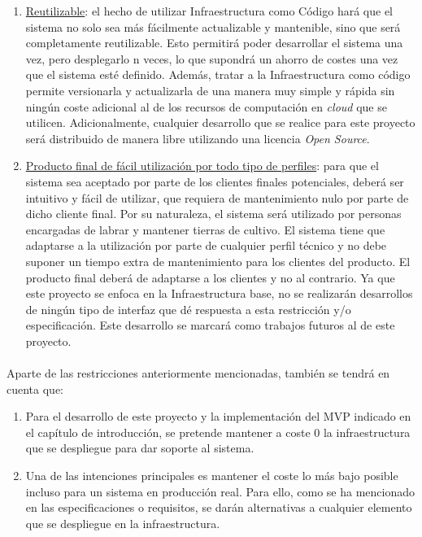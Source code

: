 \documentclass[../../memoria.tex]{subfiles}
\begin{document}
\begin{enumerate}
    \item \uline{Reutilizable}: el hecho de utilizar Infraestructura como Código hará que el sistema no solo sea más fácilmente actualizable y mantenible, sino que será completamente reutilizable. Esto permitirá poder desarrollar el sistema una vez, pero desplegarlo n veces, lo que supondrá un ahorro de costes una vez que el sistema esté definido. Además, tratar a la Infraestructura como código permite versionarla y actualizarla de una manera muy simple y rápida sin ningún coste adicional al de los recursos de computación en \textit{cloud} que se utilicen. Adicionalmente, cualquier desarrollo que se realice para este proyecto será distribuido de manera libre utilizando una licencia \textit{Open Source}.

    \item \uline{Producto final de fácil utilización por todo tipo de perfiles}: para que el sistema sea aceptado por parte de los clientes finales potenciales, deberá ser intuitivo y fácil de utilizar, que requiera de mantenimiento nulo por parte de dicho cliente final. Por su naturaleza, el sistema será utilizado por personas encargadas de labrar y mantener tierras de cultivo. El sistema tiene que adaptarse a la utilización por parte de cualquier perfil técnico y no debe suponer un tiempo extra de mantenimiento para los clientes del producto. El producto final deberá de adaptarse a los clientes y no al contrario. Ya que este proyecto se enfoca en la Infraestructura base, no se realizarán desarrollos de ningún tipo de interfaz que dé respuesta a esta restricción y/o especificación. Este desarrollo se marcará como trabajos futuros al de este proyecto.

\end{enumerate}

\paragraph{}
Aparte de las restricciones anteriormente mencionadas, también se tendrá en cuenta que:

\begin{enumerate}
    \item Para el desarrollo de este proyecto y la implementación del MVP indicado en el capítulo de introducción, se pretende mantener a coste 0 la infraestructura que se despliegue para dar soporte al sistema.

    \item Una de las intenciones principales es mantener el coste lo más bajo posible incluso para un sistema en producción real. Para ello, como se ha mencionado en las especificaciones o requisitos, se darán alternativas a cualquier elemento que se despliegue en la infraestructura.
\end{enumerate}
\end{document}
